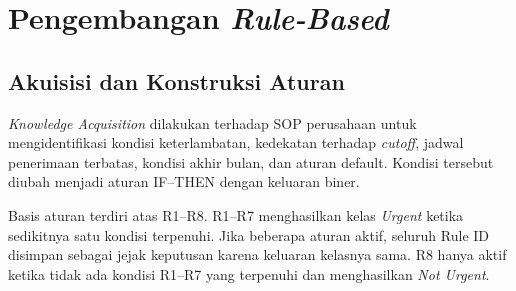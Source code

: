 
\FloatBarrier

\section{Pengembangan \textit{Rule-Based}}

\subsection{Akuisisi dan Konstruksi Aturan}

\textit{Knowledge Acquisition} dilakukan terhadap SOP perusahaan untuk mengidentifikasi kondisi keterlambatan, kedekatan terhadap \textit{cutoff}, jadwal penerimaan terbatas, kondisi akhir bulan, dan aturan default. Kondisi tersebut diubah menjadi aturan IF--THEN dengan keluaran biner.

Basis aturan terdiri atas R1--R8. R1--R7 menghasilkan kelas \textit{Urgent} ketika sedikitnya satu kondisi terpenuhi. Jika beberapa aturan aktif, seluruh Rule ID disimpan sebagai jejak keputusan karena keluaran kelasnya sama. R8 hanya aktif ketika tidak ada kondisi R1--R7 yang terpenuhi dan menghasilkan \textit{Not Urgent}.

